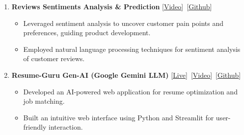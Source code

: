 \documentclass[a4paper,10pt]{article}
\begin{document}
\begin{enumerate}[label={}, nosep, after=\strut, leftmargin=2em, itemsep=2pt]
\begin{itemize}[nosep, after=\strut, itemsep=2pt]
        \end{itemize}
    \item \textbf {Reviews Sentiments Analysis \& Prediction} \hfill [\underline{\href{https://www.linkedin.com/posts/hassankhan2608_datascience-nlp-sentimentanalysis-activity-7139969581443436544-DGh4?utm_source=share&utm_medium=member_desktop}{Video}}]~[\underline{\href{https://github.com/hassankhan2608/Sentiment-Analysis-on-Amazon-Alexa-Review}{Github}}]
        \begin{itemize}[nosep, after=\strut, itemsep=2pt]
            \item Leveraged sentiment analysis to uncover customer pain points and preferences, guiding product development.
            \item Employed natural language processing techniques for sentiment analysis of customer reviews.
        \end{itemize}
    \item \textbf {Resume-Guru Gen-AI (Google Gemini LLM)} \hfill
    [\underline{\href{https://resume-guru-wekk.onrender.com}{Live}}]~[\underline{\href{https://www.linkedin.com/posts/hassankhan2608_resumeguru-jobsearch-ai-activity-7168492456827723776-WYjC?utm_source=share&utm_medium=member_desktop}{Video}}]~[\underline{\href{https://github.com/hassankhan2608/Resume-Guru}{Github}}]
        \begin{itemize}[nosep, after=\strut, itemsep=2pt]
            \item Developed an AI-powered web application for resume optimization and job matching.
            \item Built an intuitive web interface using Python and Streamlit for user-friendly interaction.
        \end{itemize}
\end{enumerate}
\end{document}
